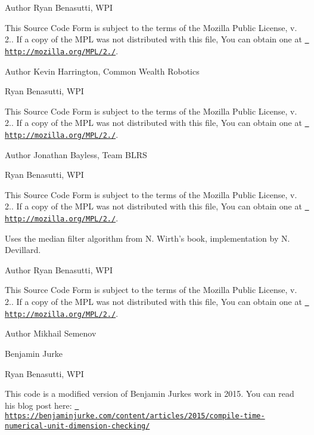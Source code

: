 \begin{DoxyAuthor}{Author}
Ryan Benasutti, W\+PI
\end{DoxyAuthor}
This Source Code Form is subject to the terms of the Mozilla Public License, v. 2.. If a copy of the M\+PL was not distributed with this file, You can obtain one at \href{http://mozilla.org/MPL/2.0/}{\texttt{ http\+://mozilla.\+org/\+M\+P\+L/2./}}.

\begin{DoxyAuthor}{Author}
Kevin Harrington, Common Wealth Robotics 

Ryan Benasutti, W\+PI
\end{DoxyAuthor}
This Source Code Form is subject to the terms of the Mozilla Public License, v. 2.. If a copy of the M\+PL was not distributed with this file, You can obtain one at \href{http://mozilla.org/MPL/2.0/}{\texttt{ http\+://mozilla.\+org/\+M\+P\+L/2./}}.

\begin{DoxyAuthor}{Author}
Jonathan Bayless, Team B\+L\+RS 

Ryan Benasutti, W\+PI
\end{DoxyAuthor}
This Source Code Form is subject to the terms of the Mozilla Public License, v. 2.. If a copy of the M\+PL was not distributed with this file, You can obtain one at \href{http://mozilla.org/MPL/2.0/}{\texttt{ http\+://mozilla.\+org/\+M\+P\+L/2./}}.

Uses the median filter algorithm from N. Wirth’s book, implementation by N. Devillard.

\begin{DoxyAuthor}{Author}
Ryan Benasutti, W\+PI
\end{DoxyAuthor}
This Source Code Form is subject to the terms of the Mozilla Public License, v. 2.. If a copy of the M\+PL was not distributed with this file, You can obtain one at \href{http://mozilla.org/MPL/2.0/}{\texttt{ http\+://mozilla.\+org/\+M\+P\+L/2./}}.

\begin{DoxyAuthor}{Author}
Mikhail Semenov 

Benjamin Jurke 

Ryan Benasutti, W\+PI
\end{DoxyAuthor}
This code is a modified version of Benjamin Jurke\textquotesingle{}s work in 2015. You can read his blog post here\+: \href{https://benjaminjurke.com/content/articles/2015/compile-time-numerical-unit-dimension-checking/}{\texttt{ https\+://benjaminjurke.\+com/content/articles/2015/compile-\/time-\/numerical-\/unit-\/dimension-\/checking/}}

